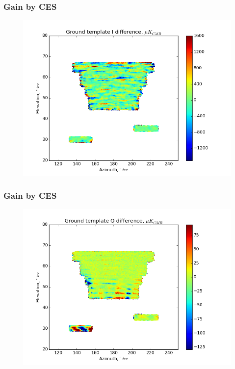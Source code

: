 \documentclass{beamer}
\begin{document}
\begin{frame}
\frametitle{Gain by CES}
\begin{figure}
\includegraphics[width=0.9\linewidth]{dI_gt_GAIN_BY_CES.png}
\end{figure}
\end{frame}

\begin{frame}
\frametitle{Gain by CES}
\begin{figure}
\includegraphics[width=0.9\linewidth]{dQ_gt_GAIN_BY_CES.png}
\end{figure}
\end{frame}
\end{document}
